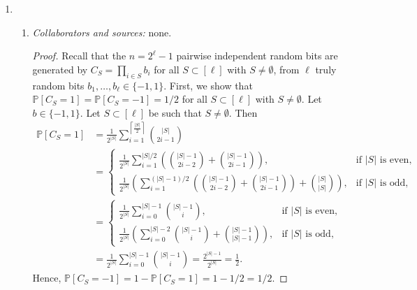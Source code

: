 \documentclass[letterpaper, reqno,11pt]{article}
\newcommand{\PP}{\mathbb{P}}
\begin{document}
\begin{enumerate}
  \item \begin{enumerate}
    \item \noindent\emph{Collaborators and sources:} none.

    \bigskip

    \begin{proof}
      Recall that the $n = 2^\ell - 1$ pairwise independent random bits are generated by $C_S = \prod_{i \in S} b_i$ for all $S \subset [\ell]$ with $S \neq \emptyset$, from $\ell$ truly random bits $b_1, \ldots, b_\ell \in \{ -1, 1 \}$. First, we show that $\PP[C_S = 1] = \PP[C_S = -1] = 1/2$ for all $S \subset [\ell]$ with $S \neq \emptyset$. Let $b \in \{ -1, 1 \}$. Let $S \subset [\ell]$ be such that $S \neq \emptyset$. Then
      \begin{align*}
        \PP\left[C_S = 1\right] &= \frac{1}{2^{|S|}} \sum_{i = 1}^{\left\lceil \frac{|S|}{2} \right\rceil} \binom{|S|}{2i - 1} \\
        &= \left\{
          \begin{array}{ll}
            \frac{1}{2^{|S|}} \sum_{i = 1}^{|S|/2} \left(\binom{|S| - 1}{2i - 2} + \binom{|S| - 1}{2i - 1}\right), & \text{if $|S|$ is even}, \\
            \frac{1}{2^{|S|}} \left(\sum_{i = 1}^{(|S| - 1)/2} \left(\binom{|S| - 1}{2i - 2} + \binom{|S| - 1}{2i - 1}\right) + \binom{|S|}{|S|}\right), & \text{if $|S|$ is odd},
          \end{array}
        \right. \\
        &= \left\{
          \begin{array}{ll}
            \frac{1}{2^{|S|}} \sum_{i = 0}^{|S| - 1} \binom{|S| - 1}{i}, & \text{if $|S|$ is even}, \\
            \frac{1}{2^{|S|}} \left(\sum_{i = 0}^{|S| - 2} \binom{|S| - 1}{i} + \binom{|S| - 1}{|S| - 1}\right), & \text{if $|S|$ is odd},
          \end{array}
        \right. \\
        &= \frac{1}{2^{|S|}} \sum_{i = 0}^{|S| - 1} \binom{|S| - 1}{i} = \frac{2^{|S| - 1}}{2^{|S|}} = \frac{1}{2}.
      \end{align*}
      Hence, $\PP[C_S = -1] = 1 - \PP[C_S = 1] = 1 - 1/2 = 1/2$.


\end{proof}
\end{enumerate}
\end{enumerate}
\end{document}
